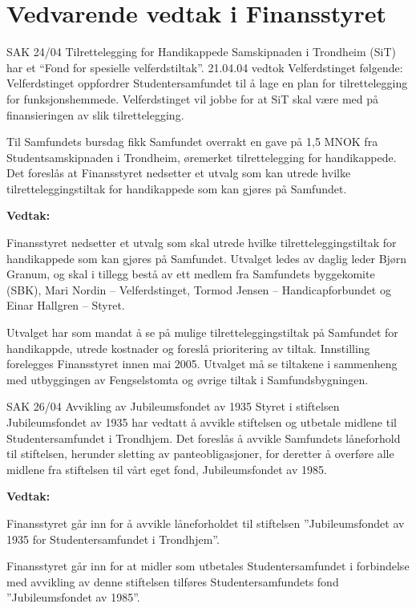 \chapter*{Vedvarende vedtak i Finansstyret}

\begin{instruksledd}{SAK 24/04 Tilrettelegging for Handikappede}
    Samskipnaden i Trondheim (SiT) har et ``Fond for spesielle velferdstiltak''. 21.04.04
    vedtok Velferdstinget følgende:
    Velferdstinget oppfordrer Studentersamfundet til å lage en plan for tilrettelegging
    for funksjonshemmede.
    Velferdstinget vil jobbe for at SiT skal være med på finansieringen av slik
    tilrettelegging.
    
    Til Samfundets bursdag fikk Samfundet overrakt en gave på 1,5 MNOK fra
    Studentsamskipnaden i Trondheim,
    øremerket tilrettelegging for handikappede.
    Det foreslås at Finansstyret nedsetter et utvalg som kan utrede hvilke
    tilretteleggingstiltak for handikappede som kan
    gjøres på Samfundet.


    \textbf{Vedtak:}

    Finansstyret nedsetter et utvalg som skal utrede hvilke tilretteleggingstiltak for
    handikappede som kan gjøres på
    Samfundet. Utvalget ledes av daglig leder Bjørn Granum, og skal i tillegg bestå av ett
    medlem fra Samfundets
    byggekomite (SBK), Mari Nordin – Velferdstinget, Tormod Jensen – Handicapforbundet og
    Einar Hallgren – Styret.
    
    Utvalget har som mandat å se på mulige tilretteleggingstiltak på Samfundet for
    handikappde, utrede kostnader og
    foreslå prioritering av tiltak. Innstilling forelegges Finansstyret innen mai 2005.
    Utvalget må se tiltakene i sammenheng med utbyggingen av Fengselstomta og øvrige
    tiltak i Samfundsbygningen.

\end{instruksledd}

\begin{instruksledd}{SAK 26/04 Avvikling av Jubileumsfondet av 1935}
    Styret i stiftelsen Jubileumsfondet av 1935 har vedtatt å avvikle stiftelsen og
    utbetale midlene til Studentersamfundet i
    Trondhjem. Det foreslås å avvikle Samfundets låneforhold til stiftelsen, herunder
    sletting av panteobligasjoner, for
    deretter å overføre alle midlene fra stiftelsen til vårt eget fond, Jubileumsfondet av
    1985.

    \textbf{Vedtak:}

    Finansstyret går inn for å avvikle låneforholdet til stiftelsen ”Jubileumsfondet av
    1935 for Studentersamfundet i
    Trondhjem”.
    
    Finansstyret går inn for at midler som utbetales Studentersamfundet i forbindelse med
    avvikling av denne stiftelsen
    tilføres Studentersamfundets fond ”Jubileumsfondet av 1985”.

\end{instruksledd}

